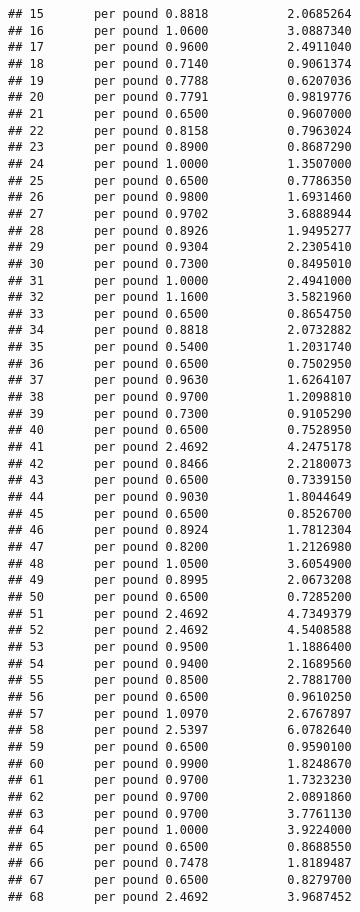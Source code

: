 \documentclass[
]{article}
\begin{document}
\begin{verbatim}
## 15       per pound 0.8818           2.0685264
## 16       per pound 1.0600           3.0887340
## 17       per pound 0.9600           2.4911040
## 18       per pound 0.7140           0.9061374
## 19       per pound 0.7788           0.6207036
## 20       per pound 0.7791           0.9819776
## 21       per pound 0.6500           0.9607000
## 22       per pound 0.8158           0.7963024
## 23       per pound 0.8900           0.8687290
## 24       per pound 1.0000           1.3507000
## 25       per pound 0.6500           0.7786350
## 26       per pound 0.9800           1.6931460
## 27       per pound 0.9702           3.6888944
## 28       per pound 0.8926           1.9495277
## 29       per pound 0.9304           2.2305410
## 30       per pound 0.7300           0.8495010
## 31       per pound 1.0000           2.4941000
## 32       per pound 1.1600           3.5821960
## 33       per pound 0.6500           0.8654750
## 34       per pound 0.8818           2.0732882
## 35       per pound 0.5400           1.2031740
## 36       per pound 0.6500           0.7502950
## 37       per pound 0.9630           1.6264107
## 38       per pound 0.9700           1.2098810
## 39       per pound 0.7300           0.9105290
## 40       per pound 0.6500           0.7528950
## 41       per pound 2.4692           4.2475178
## 42       per pound 0.8466           2.2180073
## 43       per pound 0.6500           0.7339150
## 44       per pound 0.9030           1.8044649
## 45       per pound 0.6500           0.8526700
## 46       per pound 0.8924           1.7812304
## 47       per pound 0.8200           1.2126980
## 48       per pound 1.0500           3.6054900
## 49       per pound 0.8995           2.0673208
## 50       per pound 0.6500           0.7285200
## 51       per pound 2.4692           4.7349379
## 52       per pound 2.4692           4.5408588
## 53       per pound 0.9500           1.1886400
## 54       per pound 0.9400           2.1689560
## 55       per pound 0.8500           2.7881700
## 56       per pound 0.6500           0.9610250
## 57       per pound 1.0970           2.6767897
## 58       per pound 2.5397           6.0782640
## 59       per pound 0.6500           0.9590100
## 60       per pound 0.9900           1.8248670
## 61       per pound 0.9700           1.7323230
## 62       per pound 0.9700           2.0891860
## 63       per pound 0.9700           3.7761130
## 64       per pound 1.0000           3.9224000
## 65       per pound 0.6500           0.8688550
## 66       per pound 0.7478           1.8189487
## 67       per pound 0.6500           0.8279700
## 68       per pound 2.4692           3.9687452

\end{verbatim}
\end{document}
